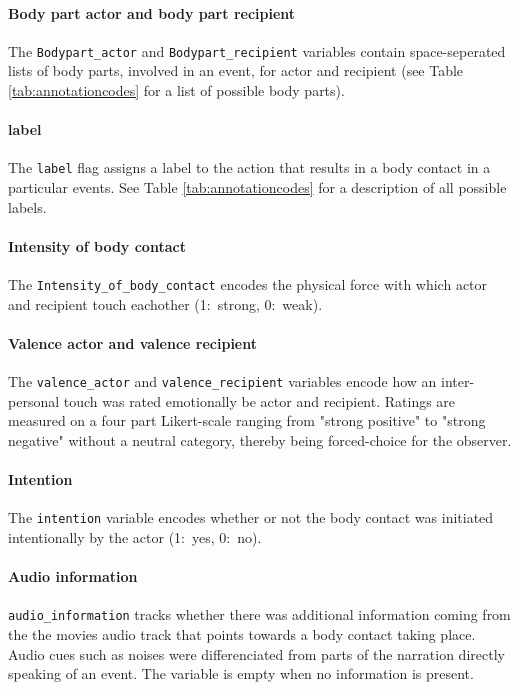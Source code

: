 \documentclass[10pt,a4paper]{article}
\begin{document}
\paragraph{Body part actor and body part recipient}
The \texttt{Bodypart\_actor} and \texttt{Bodypart\_recipient} variables contain space-seperated lists of body parts, involved in an event, for actor and recipient (see Table
\ref{tab:annotationcodes} for a list of possible body parts). 


\paragraph{label} The \texttt{label} flag assigns a label to the action that results in a body contact in a particular events. See Table
\ref{tab:annotationcodes} for a description of all possible labels.

\paragraph{Intensity of body contact} The \texttt{Intensity\_of\_body\_contact} encodes the physical force with which actor and recipient touch eachother (1:~strong,
0:~weak).

\paragraph{Valence actor and valence recipient}
The \texttt{valence\_actor} and \texttt{valence\_recipient} variables encode how an inter-personal touch was rated emotionally be actor and recipient.
Ratings are measured on a four part Likert-scale ranging from "strong positive" to "strong negative" without a neutral category, thereby being forced-choice for the observer.

\paragraph{Intention} The \texttt{intention} variable encodes whether or not the body contact was initiated intentionally by the actor (1:~yes,
0:~no).

\paragraph{Audio information}
\texttt{audio\_information} tracks whether there was additional information coming from the the movies audio track that points towards a body contact taking place. Audio cues such as noises were differenciated from parts of the narration directly speaking of an event. The variable is empty when no information is present. 
\end{document}
